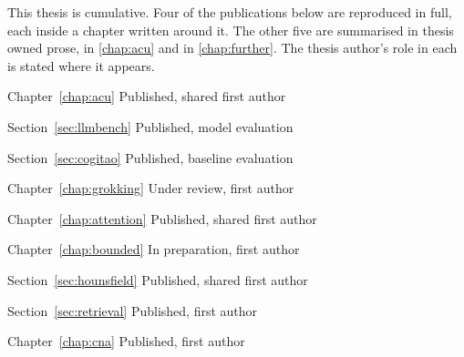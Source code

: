 %
%

This thesis is cumulative. Four of the publications below are reproduced in
full, each inside a chapter written around it. The other five are summarised
in thesis owned prose, in \cref{chap:acu} and in \cref{chap:further}. The
thesis author's role in each is stated where it appears.

\begin{publicationlist}

    {Chapter~\ref{chap:acu}}
    {Published, shared first author}

    {Section~\ref{sec:llmbench}}
    {Published, model evaluation}

    {Section~\ref{sec:cogitao}}
    {Published, baseline evaluation}

    {Chapter~\ref{chap:grokking}}
    {Under review, first author}

    {Chapter~\ref{chap:attention}}
    {Published, shared first author}

    {Chapter~\ref{chap:bounded}}
    {In preparation, first author}

    {Section~\ref{sec:hounsfield}}
    {Published, shared first author}

    {Section~\ref{sec:retrieval}}
    {Published, first author}

    {Chapter~\ref{chap:cna}}
    {Published, first author}

\end{publicationlist}
